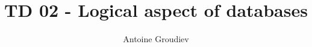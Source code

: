 \documentclass{../../cs-classes/cs-classes}
\title{TD 02 - Logical aspect of databases}
\author{Antoine Groudiev}
\begin{document}
\begin{exercise}

\end{exercise}
\end{document}
